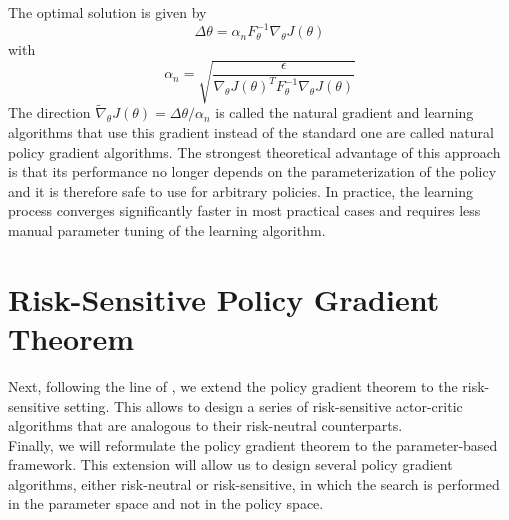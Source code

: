The optimal solution is given by 
\begin{equation*}
	\Delta \theta = \alpha_n F_\theta^{-1} \nabla_\theta J(\theta)
\end{equation*}
with 
\begin{equation*}
	\alpha_n = \sqrt{\frac{\epsilon}{\nabla_\theta J(\theta)^T F_\theta^{-1} \nabla_\theta J(\theta)} }
\end{equation*}
The direction $\widetilde{\nabla}_\theta J(\theta) = \Delta \theta / \alpha_n$ is called the natural gradient and learning algorithms that use this gradient instead of the standard one are called natural policy gradient algorithms. The strongest theoretical advantage of this approach is that its performance no longer depends on the parameterization of the policy and it is therefore safe to use for arbitrary policies. In practice, the learning process converges significantly faster in most practical cases and requires less manual parameter tuning of the learning algorithm.
\clearpage

\section{Risk-Sensitive Policy Gradient Theorem}
Next, following the line of \cite{prashanth2014actor}, we extend the policy gradient theorem to the risk-sensitive setting. This allows to design a series of risk-sensitive actor-critic algorithms that are analogous to their risk-neutral counterparts.\\
Finally, we will reformulate the policy gradient theorem to the parameter-based framework. This extension will allow us to design several policy gradient algorithms, either risk-neutral or risk-sensitive, in which the search is performed in the parameter space and not in the policy space. 

